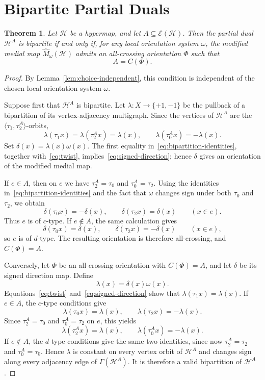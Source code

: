 \documentclass{article}
\newtheorem{theorem}{Theorem}[section]
\theoremstyle{definition}
\theoremstyle{remark}
\newcommand{\Hcal}{\mathcal{H}}
\newcommand{\Ecal}{\mathcal{E}}
\begin{document}
\section{Bipartite Partial Duals}

\begin{theorem}\label{thm:bipartite}
Let $\Hcal$ be a hypermap, and let $A\subseteq\Ecal(\Hcal)$. Then the partial dual $\Hcal^A$ is bipartite if and only if, for any local orientation system $\omega$, the modified medial map $\widehat M_\omega(\Hcal)$ admits an all-crossing orientation $\Phi$ such that
\[
A=C(\Phi).
\]
\end{theorem}

\begin{proof} By Lemma~\ref{lem:choice-independent}, this condition is independent of the chosen local orientation system $\omega$.

Suppose first that $\Hcal^A$ is bipartite. Let $\lambda:X\to\{+1,-1\}$ be the pullback of a bipartition of its vertex-adjacency multigraph. Since the vertices of $\Hcal^A$ are the $\langle\tau_1,\tau_2^A\rangle$-orbits,
\[
 \lambda(\tau_1x)=\lambda(\tau_2^Ax)=\lambda(x),
 \qquad
 \lambda(\tau_0^Ax)=-\lambda(x).\tag{B}\label{eq:bipartition-identities}
\]
Set $\delta(x)=\lambda(x)\omega(x)$. The first equality in~\eqref{eq:bipartition-identities}, together with~\eqref{eq:twist}, implies~\eqref{eq:signed-direction}; hence $\delta$ gives an orientation of the modified medial map.

If $e\in A$, then on $e$ we have $\tau_2^A=\tau_0$ and $\tau_0^A=\tau_2$. Using the identities in~\eqref{eq:bipartition-identities} and the fact that $\omega$ changes sign under both $\tau_0$ and $\tau_2$, we obtain
\[
 \delta(\tau_0x)=-\delta(x),\qquad
 \delta(\tau_2x)=\delta(x)\qquad(x\in e).
\]
Thus $e$ is of $c$-type. If $e\notin A$, the same calculation gives
\[
 \delta(\tau_0x)=\delta(x),\qquad
 \delta(\tau_2x)=-\delta(x)\qquad(x\in e),
\]
so $e$ is of $d$-type. The resulting orientation is therefore all-crossing, and $C(\Phi)=A$.

Conversely, let $\Phi$ be an all-crossing orientation with $C(\Phi)=A$, and let $\delta$ be its signed direction map. Define
\[
 \lambda(x)=\delta(x)\omega(x).
\]
Equations~\eqref{eq:twist} and~\eqref{eq:signed-direction} show that $\lambda(\tau_1x)=\lambda(x)$. If $e\in A$, the $c$-type conditions give
\[
 \lambda(\tau_0x)=\lambda(x),\qquad
 \lambda(\tau_2x)=-\lambda(x).
\]
Since $\tau_2^A=\tau_0$ and $\tau_0^A=\tau_2$ on $e$, this yields
\[
 \lambda(\tau_2^Ax)=\lambda(x),\qquad
 \lambda(\tau_0^Ax)=-\lambda(x).
\]
If $e\notin A$, the $d$-type conditions give the same two identities, since now $\tau_2^A=\tau_2$ and $\tau_0^A=\tau_0$. Hence $\lambda$ is constant on every vertex orbit of $\Hcal^A$ and changes sign along every adjacency edge of $\Gamma(\Hcal^A)$. It is therefore a valid bipartition of $\Hcal^A$.
\end{proof}
\end{document}

